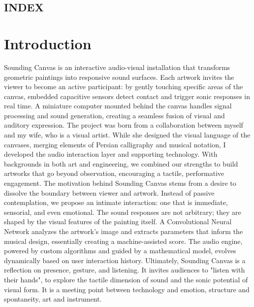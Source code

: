 \documentclass{article}
\title{\titolo}
\author{\autore}
\begin{document}
 
\begin{titlepage}
\clearpage\maketitle
\thispagestyle{empty}
\end{titlepage}

\begin{centering}
	\section*{INDEX}
\end{centering}
\renewcommand*\contentsname{ }
\tableofcontents
\listoffigures
\listoftables



\newpage



\section{Introduction}
Sounding Canvas is an interactive audio-visual installation that transforms geometric paintings into responsive sound surfaces. Each artwork invites the viewer to become an active participant: by gently touching specific areas of the canvas, embedded capacitive sensors detect contact and trigger sonic responses in real time. A miniature computer mounted behind the canvas handles signal processing and sound generation, creating a seamless fusion of visual and auditory expression. \newline
The project was born from a collaboration between myself and my wife, who is a visual artist. While she designed the visual language of the canvases, merging elements of Persian calligraphy and musical notation, I developed the audio interaction layer and supporting technology. With backgrounds in both art and engineering, we combined our strengths to build artworks that go beyond observation, encouraging a tactile, performative engagement. \newline 
The motivation behind Sounding Canvas stems from a desire to dissolve the boundary between viewer and artwork. Instead of passive contemplation, we propose an intimate interaction: one that is immediate, sensorial, and even emotional. 
 The sound responses are not arbitrary; they are shaped by the visual features of the painting itself. \newline
A Convolutional Neural Network analyzes the artwork’s image and extracts parameters that inform the musical design, essentially creating a machine-assisted score. The audio engine, powered by custom algorithms and guided by a mathematical model, evolves dynamically based on user interaction history.
\newline
Ultimately, Sounding Canvas is a reflection on presence, gesture, and listening. It invites audiences to "listen with their hands", to explore the tactile dimension of sound and the sonic potential of visual form. It is a meeting point between technology and emotion, structure and spontaneity, art and instrument.
\end{document}
